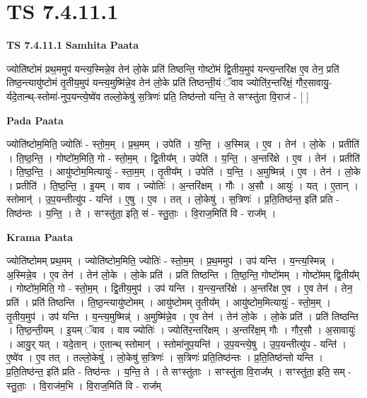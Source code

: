 \documentclass[17pt]{extarticle}
\begin{document}
\section{ TS 7.4.11.1 }

\textbf{TS 7.4.11.1 } \newline
\textbf{Samhita Paata} \newline

ज्योति॑ष्टोमं प्रथ॒ममुप॑ यन्त्य॒स्मिन्ने॒व तेन॑ लो॒के प्रति॑ तिष्ठन्ति॒ गोष्टो॑मं द्वि॒तीय॒मुप॑ यन्त्य॒न्तरि॑क्ष ए॒व तेन॒ प्रति॑ तिष्ठ॒न्त्यायु॑ष्टोमं तृ॒तीय॒मुप॑ यन्त्य॒मुष्मि॑न्ने॒व तेन॑ लो॒के प्रति॑ तिष्ठन्ती॒यं ॅवाव ज्योति॑र॒न्तरि॑क्षं॒ गौर॒सावायु॒-र्यदे॒तान्थ्-स्तोमा॑-नुप॒यन्त्ये॒ष्वे॑व तल्लो॒केषु॑ स॒त्रिणः॑ प्रति॒ तिष्ठ॑न्तो यन्ति॒ ते सꣳस्तु॑ता वि॒राज॑ - [  ] \newline

\textbf{Pada Paata} \newline

ज्योति॑ष्टोम॒मिति॒ ज्योतिः॑ - स्तो॒म॒म् । प्र॒थ॒मम् । उपेति॑ । य॒न्ति॒ । अ॒स्मिन्न् । ए॒व । तेन॑ । लो॒के । प्रतीति॑ । ति॒ष्ठ॒न्ति॒ । गोष्टो॑म॒मिति॒ गो - स्तो॒म॒म् । द्वि॒तीय᳚म् । उपेति॑ । य॒न्ति॒ । अ॒न्तरि॑क्षे । ए॒व । तेन॑ । प्रतीति॑ । ति॒ष्ठ॒न्ति॒ । आयु॑ष्टोम॒मित्यायुः॑ - स्ता॒म॒म् । तृ॒तीय᳚म् । उपेति॑ । य॒न्ति॒ । अ॒मुष्मिन्न्॑ । ए॒व । तेन॑ । लो॒के । प्रतीति॑ । ति॒ष्ठ॒न्ति॒ । इ॒यम् । वाव । ज्योतिः॑ । अ॒न्तरि॑क्षम् । गौः । अ॒सौ । आयुः॑ । यत् । ए॒तान् । स्तोमान्॑ । उ॒प॒यन्तीत्यु॑प - यन्ति॑ । ए॒षु । ए॒व । तत् । लो॒केषु॑ । स॒त्रिणः॑ । प्र॒ति॒तिष्ठ॑न्त॒ इति॑ प्रति - तिष्ठ॑न्तः । य॒न्ति॒ । ते । सꣳस्तु॑ता॒ इति॒ सं - स्तु॒ताः॒ । वि॒राज॒मिति॑ वि - राज᳚म् ।  \newline


\textbf{Krama Paata} \newline

ज्योति॑ष्टोमम् प्रथ॒मम् । ज्योति॑ष्टोम॒मिति॒ ज्योतिः॑ - स्तो॒म॒म् । प्र॒थ॒ममुप॑ । उप॑ यन्ति । य॒न्त्य॒स्मिन्न् । अ॒स्मिन्ने॒व । ए॒व तेन॑ । तेन॑ लो॒के । लो॒के प्रति॑ । प्रति॑ तिष्ठन्ति । ति॒ष्ठ॒न्ति॒ गोष्टो॑मम् । गोष्टो॑मम् द्वि॒तीय᳚म् । गोष्टो॑म॒मिति॒ गो - स्तो॒म॒म् । द्वि॒तीय॒मुप॑ । उप॑ यन्ति । य॒न्त्य॒न्तरि॑क्षे । अ॒न्तरि॑क्ष ए॒व । ए॒व तेन॑ । तेन॒ प्रति॑ । प्रति॑ तिष्ठन्ति । ति॒ष्ठ॒न्त्यायु॑ष्टोमम् । आयु॑ष्टोमम् तृ॒तीय᳚म् । आयु॑ष्टोम॒मित्यायुः॑ - स्तो॒म॒म् । तृ॒तीय॒मुप॑ । उप॑ यन्ति । य॒न्त्य॒मुष्मिन्न्॑ । अ॒मुष्मि॑न्ने॒व । ए॒व तेन॑ । तेन॑ लो॒के । लो॒के प्रति॑ । प्रति॑ तिष्ठन्ति । ति॒ष्ठ॒न्ती॒यम् । इ॒यम् ॅवाव । वाव ज्योतिः॑ । ज्योति॑र॒न्तरि॑क्षम् । अ॒न्तरि॑क्ष॒म् गौः । गौर॒सौ । अ॒सावायुः॑ । आयु॒र् यत् । यदे॒तान् । ए॒तान्थ् स्तोमान्॑ । स्तोमा॑नुप॒यन्ति॑ । उ॒प॒यन्त्ये॒षु । उ॒प॒यन्तीत्यु॑प - यन्ति॑ । ए॒ष्वे॑व । ए॒व तत् । तल्लो॒केषु॑ । लो॒केषु॑ स॒त्रिणः॑ । स॒त्रिणः॑ प्रति॒तिष्ठ॑न्तः । प्र॒ति॒तिष्ठ॑न्तो यन्ति । प्र॒ति॒तिष्ठ॑न्त॒ इति॑ प्रति - तिष्ठ॑न्तः । य॒न्ति॒ ते । ते सꣳस्तु॑ताः । सꣳस्तु॑ता वि॒राज᳚म् । सꣳस्तु॑ता॒ इति॒ सम् - स्तु॒ताः॒ । वि॒राज॑म॒भि । वि॒राज॒मिति॑ वि - राज᳚म् \newline
\end{document}
